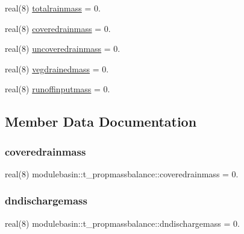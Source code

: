 \begin{DoxyCompactItemize}
\item 
real(8) \mbox{\hyperlink{structmodulebasin_1_1t__propmassbalance_a4e33ed68a03815b5c89dcf46d7146898}{totalrainmass}} = 0.
\item 
real(8) \mbox{\hyperlink{structmodulebasin_1_1t__propmassbalance_aace3d5673a86e69284cd248702a2eaaf}{coveredrainmass}} = 0.
\item 
real(8) \mbox{\hyperlink{structmodulebasin_1_1t__propmassbalance_a56acce5f7fab5f2657618079f128faf4}{uncoveredrainmass}} = 0.
\item 
real(8) \mbox{\hyperlink{structmodulebasin_1_1t__propmassbalance_aa8d066a3fd156171b71b5afc4bfea044}{vegdrainedmass}} = 0.
\item 
real(8) \mbox{\hyperlink{structmodulebasin_1_1t__propmassbalance_a404aaad4b08a8594068eaeeb3924dcfb}{runoffinputmass}} = 0.
\end{DoxyCompactItemize}


\subsection{Member Data Documentation}
\mbox{\label{structmodulebasin_1_1t__propmassbalance_aace3d5673a86e69284cd248702a2eaaf}} 
\subsubsection{\texorpdfstring{coveredrainmass}{coveredrainmass}}
{\footnotesize\ttfamily real(8) modulebasin\+::t\+\_\+propmassbalance\+::coveredrainmass = 0.\hspace{0.3cm}{\ttfamily [private]}}

\mbox{\label{structmodulebasin_1_1t__propmassbalance_af9fede2785055e3bc97dc5bfbb8860ac}} 
\subsubsection{\texorpdfstring{dndischargemass}{dndischargemass}}
{\footnotesize\ttfamily real(8) modulebasin\+::t\+\_\+propmassbalance\+::dndischargemass = 0.\hspace{0.3cm}{\ttfamily [private]}}

